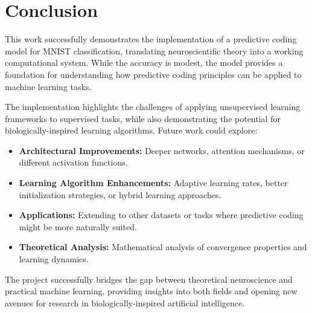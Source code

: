 \documentclass[a4paper,12pt]{article}
\begin{document}
\section{Conclusion}
This work successfully demonstrates the implementation of a predictive coding model for MNIST classification, translating neuroscientific theory into a working computational system. While the accuracy is modest, the model provides a foundation for understanding how predictive coding principles can be applied to machine learning tasks.

The implementation highlights the challenges of applying unsupervised learning frameworks to supervised tasks, while also demonstrating the potential for biologically-inspired learning algorithms. Future work could explore:

\begin{itemize}
    \item \textbf{Architectural Improvements:} Deeper networks, attention mechanisms, or different activation functions.
    \item \textbf{Learning Algorithm Enhancements:} Adaptive learning rates, better initialization strategies, or hybrid learning approaches.
    \item \textbf{Applications:} Extending to other datasets or tasks where predictive coding might be more naturally suited.
    \item \textbf{Theoretical Analysis:} Mathematical analysis of convergence properties and learning dynamics.
\end{itemize}

The project successfully bridges the gap between theoretical neuroscience and practical machine learning, providing insights into both fields and opening new avenues for research in biologically-inspired artificial intelligence.
\end{document}
